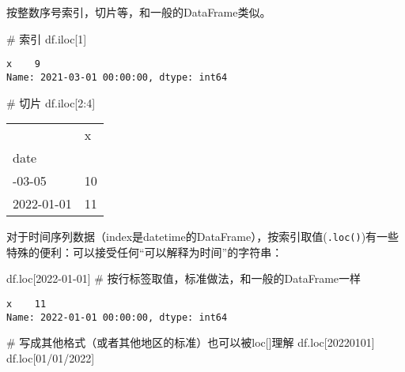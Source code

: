 \documentclass[
  letterpaper,
  DIV=11,
  numbers=noendperiod]{scrreprt}
\newenvironment{Shaded}{\begin{snugshade}}{\end{snugshade}}
\newcommand{\CommentTok}[1]{\textcolor[rgb]{0.37,0.37,0.37}{#1}}
\newcommand{\DecValTok}[1]{\textcolor[rgb]{0.68,0.00,0.00}{#1}}
\newcommand{\NormalTok}[1]{\textcolor[rgb]{0.00,0.23,0.31}{#1}}
\newcommand{\StringTok}[1]{\textcolor[rgb]{0.13,0.47,0.30}{#1}}
\begin{document}
按整数序号索引，切片等，和一般的DataFrame类似。

\begin{Shaded}
\begin{Highlighting}[]

\CommentTok{\# 索引}
\NormalTok{df.iloc[}\DecValTok{1}\NormalTok{]}
\end{Highlighting}
\end{Shaded}

\begin{verbatim}
x    9
Name: 2021-03-01 00:00:00, dtype: int64
\end{verbatim}

\begin{Shaded}
\begin{Highlighting}[]
\CommentTok{\# 切片}
\NormalTok{df.iloc[}\DecValTok{2}\NormalTok{:}\DecValTok{4}\NormalTok{]}
\end{Highlighting}
\end{Shaded}

\begin{longtable}[]{@{}ll@{}}
\toprule\noalign{}
& x \\
date & \\
\midrule\noalign{}
\endhead
\bottomrule\noalign{}
\endlastfoot
2021-03-05 & 10 \\
2022-01-01 & 11 \\
\end{longtable}

对于时间序列数据（index是datetime的DataFrame），按索引取值(\texttt{.loc()})有一些特殊的便利：可以接受任何``可以解释为时间''的字符串：

\begin{Shaded}
\begin{Highlighting}[]
\NormalTok{df.loc[}\StringTok{\textquotesingle{}2022{-}01{-}01\textquotesingle{}}\NormalTok{] }\CommentTok{\# 按行标签取值，标准做法，和一般的DataFrame一样}
\end{Highlighting}
\end{Shaded}

\begin{verbatim}
x    11
Name: 2022-01-01 00:00:00, dtype: int64
\end{verbatim}

\begin{Shaded}
\begin{Highlighting}[]
\CommentTok{\# 写成其他格式（或者其他地区的标准）也可以被loc[]理解}
\NormalTok{df.loc[}\StringTok{\textquotesingle{}20220101\textquotesingle{}}\NormalTok{]      }
\NormalTok{df.loc[}\StringTok{\textquotesingle{}01/01/2022\textquotesingle{}}\NormalTok{]  }
\end{Highlighting}
\end{Shaded}
\end{document}
